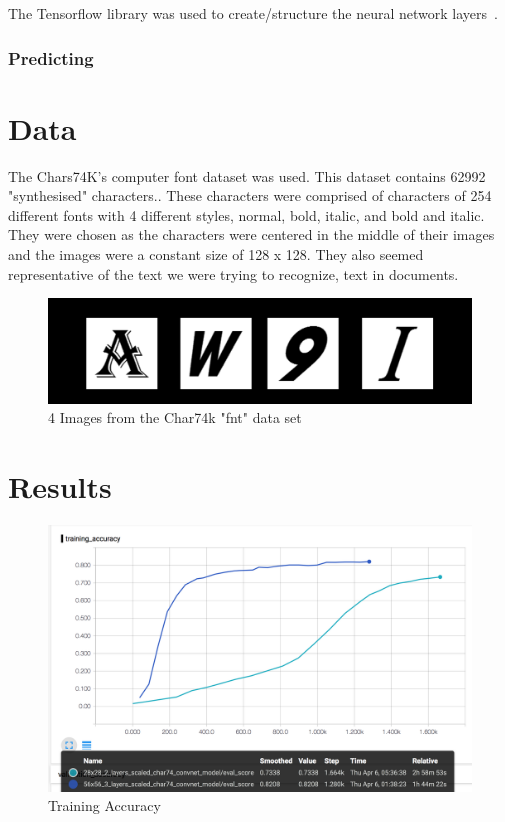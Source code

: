\documentclass[11pt]{article}
\begin{document}
The Tensorflow library was used to create/structure the neural network layers~\cite{tensorflow15-whitepaper}.

\subsubsection{Predicting}

\section{Data}
The Chars74K's computer font dataset was used. This dataset contains 62992 "synthesised" characters.\cite{deCampos09}. These characters were comprised of characters of 254 different fonts with 4 different styles, normal, bold, italic, and bold and italic.\cite{deCampos09} They were chosen as the characters were centered in the middle of their images and the images were a constant size of 128 x 128. They also seemed representative of the text we were trying to recognize, text in documents.

\begin{figure}
    \centering
    \includegraphics[scale=0.4]{training_data_sample.png}
    \caption{4 Images from the Char74k "fnt" data set}
    \label{fig:char74k_data}
\end{figure}

\section{Results}

\begin{figure}
    \centering
    \includegraphics[scale=0.4]{training_accuracy.png}
    \caption{Training Accuracy}
    \label{fig:training_accuracy}
\end{figure}
\end{document}
